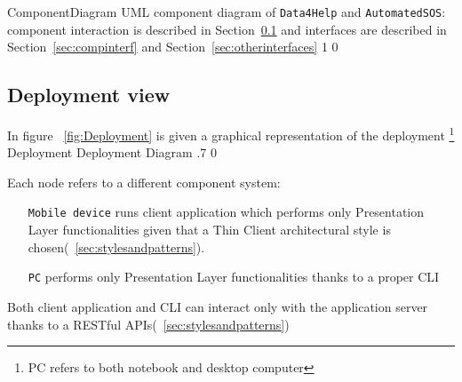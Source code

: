 \documentclass[../DD0.tex]{subfiles}
\begin{document}
        \fetchUML
          {ComponentDiagram}
          {UML component diagram of \texttt{Data4Help} and \texttt{AutomatedSOS}: component interaction is described in Section~\ref{sec:deplview} and interfaces are described in Section~\ref{sec:compinterf} and Section~\ref{sec:otherinterfaces}}
          {1}           %
          {0}           %

  \clearpage

  \subsection{Deployment view}
  \label{sec:deplview}
 In figure ~\ref{fig:Deployment} is given a graphical representation of the deployment \footnote{PC refers to both notebook and desktop computer}
  \fetchUML
        {Deployment}
        {Deployment Diagram}
        {.7}           %
        {0}           %

Each node refers to a different component system:
\begin{itemize}
  \item [\texttt{Mobile device}] runs client application which performs only Presentation Layer functionalities given that a Thin Client architectural style is chosen(~\ref{sec:stylesandpatterns}). 
  \item [\texttt{PC}] performs only Presentation Layer functionalities thanks to a proper CLI
\end{itemize}

Both client application and CLI can interact only with the application server thanks to a RESTful APIs(~\ref{sec:stylesandpatterns})
\end{document}
